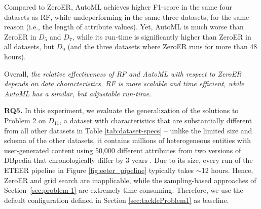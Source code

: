 
Compared to ZeroER, AutoML achieves higher F1-score in the same four datasets as RF, while undeperforming in the same three datasets, for the same reason (i.e., the length of attribute values). Yet, AutoML is much worse than ZeroER in $D_5$ and $D_7$, while its run-time is significantly higher than ZeroER in all datasets, but $D_9$ (and the three datasets where ZeroER runs for more than 48 hours). 

Overall, \textit{the relative effectiveness of RF and AutoML with respect to ZeroER depends on data characteristics. RF is more scalable and time efficient, while AutoML has a similar, but adjustable run-time}.


\textbf{RQ5.} In this experiment, we evaluate the generalization of the solutions to Problem 2 on $D_{11}$, a dataset with characteristics that are substantially different from all other datasets in Table \ref{tab:dataset-specs} -- unlike the limited size and schema of the other datasets, it contains millions of heterogeneous entities with user-generated content using 50,000 different attributes from two versions of DBpedia that chronologically differ by 3 years \cite{DBLP:journals/is/PapadakisMGSTGB20}.
Due to its size, every run of the ETEER pipeline in Figure \ref{fig:eeter_pipeline} typically takes $\sim$12 hours.
Hence, ZeroER and grid search are inapplicable,
while the sampling-based approaches of Section~\ref{sec:problem-1} are extremely time consuming. Therefore, we use the default configuration defined in Section \ref{sec:tackleProblem1} as baseline.


